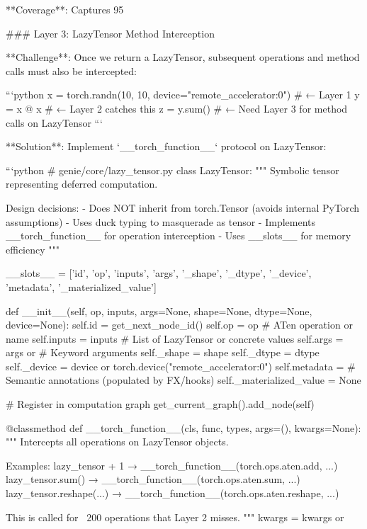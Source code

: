 **Coverage**: Captures 95%

### Layer 3: LazyTensor Method Interception

**Challenge**: Once we return a LazyTensor, subsequent operations and method calls must also be intercepted:

```python
x = torch.randn(10, 10, device="remote_accelerator:0")  # ← Layer 1
y = x @ x  # ← Layer 2 catches this
z = y.sum()  # ← Need Layer 3 for method calls on LazyTensor
```

**Solution**: Implement `__torch_function__` protocol on LazyTensor:

```python
# genie/core/lazy_tensor.py
class LazyTensor:
    """
    Symbolic tensor representing deferred computation.
    
    Design decisions:
    - Does NOT inherit from torch.Tensor (avoids internal PyTorch assumptions)
    - Uses duck typing to masquerade as tensor
    - Implements __torch_function__ for operation interception
    - Uses __slots__ for memory efficiency
    """
    
    __slots__ = ['id', 'op', 'inputs', 'args', '_shape', '_dtype', 
                 '_device', 'metadata', '_materialized_value']
    
    def __init__(self, op, inputs, args=None, shape=None, 
                 dtype=None, device=None):
        self.id = get_next_node_id()
        self.op = op  # ATen operation or name
        self.inputs = inputs  # List of LazyTensor or concrete values
        self.args = args or {}  # Keyword arguments
        self._shape = shape
        self._dtype = dtype
        self._device = device or torch.device("remote_accelerator:0")
        self.metadata = {}  # Semantic annotations (populated by FX/hooks)
        self._materialized_value = None
        
        # Register in computation graph
        get_current_graph().add_node(self)
    
    @classmethod
    def __torch_function__(cls, func, types, args=(), kwargs=None):
        """
        Intercepts all operations on LazyTensor objects.
        
        Examples:
            lazy_tensor + 1      → __torch_function__(torch.ops.aten.add, ...)
            lazy_tensor.sum()    → __torch_function__(torch.ops.aten.sum, ...)
            lazy_tensor.reshape(...)  → __torch_function__(torch.ops.aten.reshape, ...)
        
        This is called for ~200 operations that Layer 2 misses.
        """
        kwargs = kwargs or {}
        
